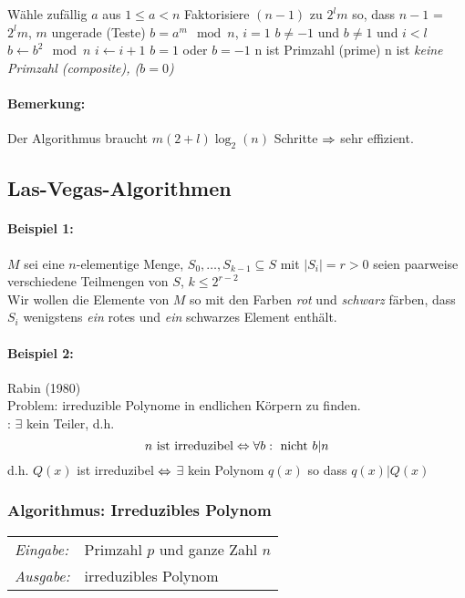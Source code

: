 \documentclass[a4paper,twoside,DIV15,BCOR12mm]{scrbook}
\begin{document}
\begin{codebox}
\li Wähle zufällig $a$ aus $1 \leq a < n$
\li Faktorisiere $(n-1)$ zu $2^l m$ so, dass $n-1$ = $2^l m$, $m$ ungerade
\li (Teste) $b = a^m \mod n$, $i = 1$ 
\li \While $b \neq -1$ und $b \neq 1$ und $i < l$
\li     \Do 
            $b \gets b^2 \mod n$
\li         $i \gets i + 1$
        \End
\li \If $b = 1$ oder $b = -1$
\li     \Then
                n ist Primzahl (prime)
\li     \Else
                n ist \em{keine} Primzahl (composite), ($b = 0$)
\end{codebox}

\paragraph{Bemerkung:} Der Algorithmus braucht $m(2+l)\log_2(n)$ Schritte $\Rightarrow$ sehr effizient.

\subsection{Las-Vegas-Algorithmen}

\paragraph{Beispiel 1:} $M$ sei eine $n$-elementige Menge, $S_0, \dots, S_{k-1} \subseteq S$ mit $|S_i|=r>0$ seien paarweise verschiedene Teilmengen von $S$, $k \le 2^{r-2}$\\
Wir wollen die Elemente von $M$ so mit den Farben \emph{rot} und \emph{schwarz} färben, dass $S_i$ wenigstens \emph{ein} rotes und \emph{ein} schwarzes Element enthält.

\paragraph{Beispiel 2:} Rabin (1980)\\
Problem: irreduzible Polynome in endlichen Körpern zu finden.\\
: $\exists$ kein Teiler, d.h. $$n \text{ ist irreduzibel} \Leftrightarrow \forall b: \text{ nicht } b|n$$
d.h. $Q(x)$ ist irreduzibel $\Leftrightarrow$ $\exists$ kein Polynom $q(x)$ so dass $q(x)|Q(x)$

\subsubsection{Algorithmus: Irreduzibles Polynom}
\begin{tabular}{ll}
	\emph{Eingabe:} & Primzahl $p$ und ganze Zahl $n$\\
	\emph{Ausgabe:} & irreduzibles Polynom
\end{tabular}\bigskip
\end{document}
